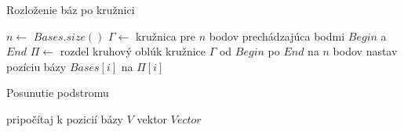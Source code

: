 
\begin{algorithm}
  \caption{Rozloženie báz po kružnici}
  \label{alg:operacia_circle_reinsert}
  \begin{algorithmic}[1]
      \State $n \gets$ $Bases.size()$
      \State $\Gamma \gets$ kružnica pre $n$ bodov prechádzajúca bodmi $Begin$ a $End$
      \State $\Pi \gets$ rozdel kruhový oblúk kružnice $\Gamma$ od $Begin$ po $End$ na $n$ bodov
        \State nastav pozíciu bázy $Bases[i]$ na $\Pi[i]$
      \EndFor
    \EndProcedure
  \end{algorithmic}
\end{algorithm}

\begin{algorithm}
  \caption{Posunutie podstromu}
  \label{alg:operacia_tree_shift}
  \begin{algorithmic}[1]
          \State pripočítaj k pozicií bázy $V$ vektor $Vector$
        \EndIf
      \EndFor
    \EndProcedure
  \end{algorithmic}
\end{algorithm}
